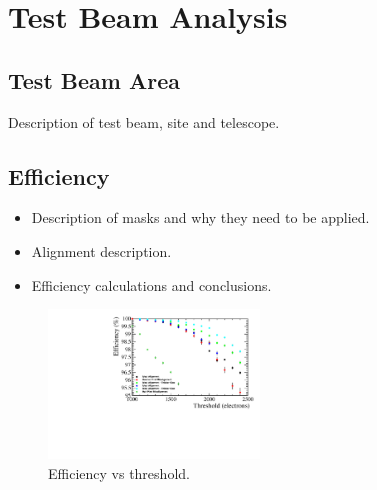 \section{Test Beam Analysis}
\subsection{Test Beam Area}
Description of test beam, site and telescope.

\subsection{Efficiency}

\begin{itemize}
\item Description of masks and why they need to be applied.
\item Alignment description.
\item Efficiency calculations and conclusions. 
\end{itemize}

\begin{figure}
\centering
\includegraphics[width=0.5\textwidth]{CLICdpVertex/Plots/ZoomedEfficiency.pdf}
\caption[Efficiency vs threshold.]{Efficiency vs threshold.}
\label{fig:efficiency}
\end{figure}




  
